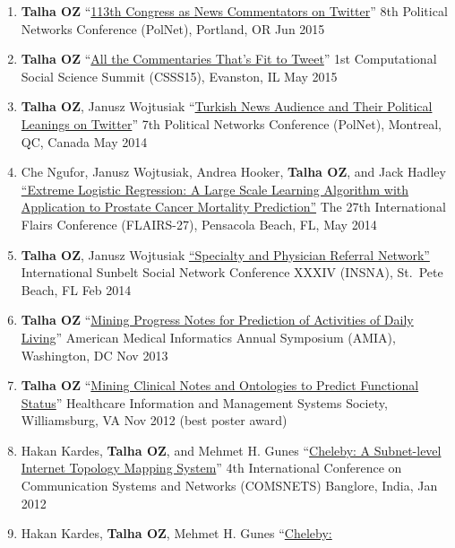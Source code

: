 \documentclass[11pt, letter]{article}
\begin{document}
\begin{raggedright}
\begin{enumerate}
\def\labelenumi{\arabic{enumi}.}
\itemsep1pt\parskip0pt
\item
  \textbf{Talha OZ} ``\href{http://toz.us/pubs/\#toAppear}{113th
  Congress as News Commentators on Twitter}'' 8th Political Networks
  Conference (PolNet), Portland, OR Jun 2015
\item
  \textbf{Talha OZ} ``\href{http://toz.us/pubs/\#toAppear}{All the
  Commentaries That's Fit to Tweet}'' 1st Computational Social Science
  Summit (CSSS15), Evanston, IL May 2015
\item
  \textbf{Talha OZ}, Janusz Wojtusiak
  ``\href{http://www.mli.gmu.edu/toz/publications/2014-POLNET.pdf}{Turkish
  News Audience and Their Political Leanings on Twitter}'' 7th Political
  Networks Conference (PolNet), Montreal, QC, Canada May 2014
\item
  Che Ngufor, Janusz Wojtusiak, Andrea Hooker, \textbf{Talha OZ}, and
  Jack Hadley
  \href{http://www.mli.gmu.edu/toz/publications/2014-FLAIRS.pdf}{``Extreme
  Logistic Regression: A Large Scale Learning Algorithm with Application
  to Prostate Cancer Mortality Prediction''} The 27th International
  Flairs Conference (FLAIRS-27), Pensacola Beach, FL, May 2014
\item
  \textbf{Talha OZ}, Janusz Wojtusiak
  \href{http://www.mli.gmu.edu/toz/publications/2014-SUNBELT.pdf}{``Specialty
  and Physician Referral Network''} International Sunbelt Social Network
  Conference XXXIV (INSNA), St.~Pete Beach, FL Feb 2014
\item
  \textbf{Talha OZ}
  ``\href{http://www.mli.gmu.edu/toz/publications/2013-AMIA.pdf}{Mining
  Progress Notes for Prediction of Activities of Daily Living}''
  American Medical Informatics Annual Symposium (AMIA), Washington, DC
  Nov 2013
\item
  \textbf{Talha OZ}
  ``\href{http://www.mli.gmu.edu/toz/publications/2012-HIMSS.pdf}{Mining
  Clinical Notes and Ontologies to Predict Functional Status}''
  Healthcare Information and Management Systems Society, Williamsburg,
  VA Nov 2012 (best poster award)
\item
  Hakan Kardes, \textbf{Talha OZ}, and Mehmet H. Gunes
  ``\href{http://www.mli.gmu.edu/toz/publications/2012-COMSNETS.pdf}{Cheleby:
  A Subnet-level Internet Topology Mapping System}'' 4th International
  Conference on Communication Systems and Networks (COMSNETS) Banglore,
  India, Jan 2012
\item
  Hakan Kardes, \textbf{Talha OZ}, Mehmet H. Gunes
  ``\href{http://www.mli.gmu.edu/toz/publications/2011-AIMS.pdf}{Cheleby:
}
\end{enumerate}
\end{raggedright}
\end{document}

